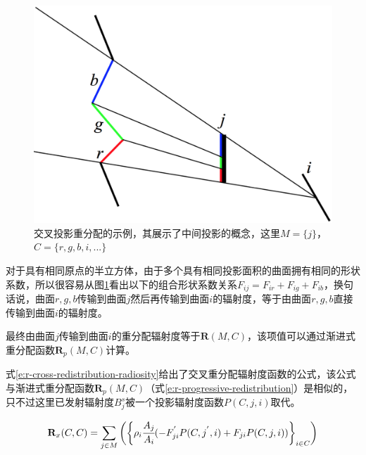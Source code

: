 \begin{figure}
\sidecaption
	\includegraphics[width=.6\textwidth]{figures/r/path-39}
	\caption{交叉投影重分配的示例，其展示了中间投影的概念，这里$M = \{j\}$，$C = \{r,g,b,i,...\}$}
	\label{f:r-c-c}
\end{figure}

对于具有相同原点的半立方体，由于多个具有相同投影面积的曲面拥有相同的形状系数，所以很容易从图\ref{f:r-c-c}看出以下的组合形状系数关系$F_{ij}=F_{ir}+F_{ig}+F_{ib}$，换句话说，曲面$r,g,b$传输到曲面$j$然后再传输到曲面$i$的辐射度，等于由曲面$r,g,b$直接传输到曲面$i$的辐射度。

最终由曲面$j$传输到曲面$i$的重分配辐射度等于$\mathbf{R}(M,C)$，该项值可以通过渐进式重分配函数$\mathbf{R}_p(M, C)$计算。

式\ref{e:r-cross-redistribution-radiosity}给出了交叉重分配辐射度函数的公式，该公式与渐进式重分配函数$\mathbf{R}_p(M,C)$（式\ref{e:r-progressive-redistribution}）是相似的，只不过这里已发射辐射度$B_j^{s}$被一个投影辐射度函数$P(C,j,i)$取代。

\begin{equation}\label{e:r-cross-redistribution-radiosity}
	\mathbf{R}_x(C,C)=\sum_{j\in M}\bigg(\bigg\{\rho_i \cfrac{A_j}{A_i}(-F^{'}_{ji}P(C,j^{'},i)+F_{ji}P(C,j,i))\bigg\}_{i\in C}\bigg)	
\end{equation}
